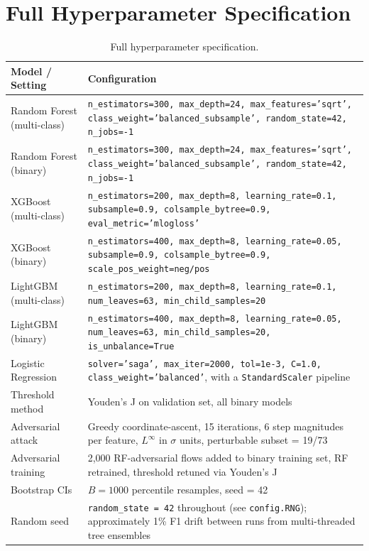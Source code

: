\chapter{Full Hyperparameter Specification}
\label{app:hyperparams}

\begin{table}[H]
    \centering
    \caption{Full hyperparameter specification.}
    \label{tab:hyperparams}
    \footnotesize
    \begin{tabular}{p{4.0cm}p{10.5cm}}
        \toprule
        \textbf{Model / Setting} & \textbf{Configuration} \\
        \midrule
        Random Forest (multi-class) & \texttt{n\_estimators=300, max\_depth=24, max\_features='sqrt', class\_weight='balanced\_subsample', random\_state=42, n\_jobs=-1} \\
        \addlinespace
        Random Forest (binary) & \texttt{n\_estimators=300, max\_depth=24, max\_features='sqrt', class\_weight='balanced\_subsample', random\_state=42, n\_jobs=-1} \\
        \addlinespace
        XGBoost (multi-class) & \texttt{n\_estimators=200, max\_depth=8, learning\_rate=0.1, subsample=0.9, colsample\_bytree=0.9, eval\_metric='mlogloss'} \\
        \addlinespace
        XGBoost (binary) & \texttt{n\_estimators=400, max\_depth=8, learning\_rate=0.05, subsample=0.9, colsample\_bytree=0.9, scale\_pos\_weight=neg/pos} \\
        \addlinespace
        LightGBM (multi-class) & \texttt{n\_estimators=200, max\_depth=8, learning\_rate=0.1, num\_leaves=63, min\_child\_samples=20} \\
        \addlinespace
        LightGBM (binary) & \texttt{n\_estimators=400, max\_depth=8, learning\_rate=0.05, num\_leaves=63, min\_child\_samples=20, is\_unbalance=True} \\
        \addlinespace
        Logistic Regression & \texttt{solver='saga', max\_iter=2000, tol=1e-3, C=1.0, class\_weight='balanced'}, with a \texttt{StandardScaler} pipeline \\
        \addlinespace
        Threshold method & Youden's J on validation set, all binary models \\
        \addlinespace
        Adversarial attack & Greedy coordinate-ascent, 15 iterations, 6 step magnitudes per feature, $L^\infty$ in $\sigma$ units, perturbable subset = 19/73 \\
        \addlinespace
        Adversarial training & 2{,}000 RF-adversarial flows added to binary training set, RF retrained, threshold retuned via Youden's J \\
        \addlinespace
        Bootstrap CIs & $B = 1000$ percentile resamples, seed = 42 \\
        \addlinespace
        Random seed & \texttt{random\_state = 42} throughout (see \texttt{config.RNG}); approximately 1\% F1 drift between runs from multi-threaded tree ensembles \\
        \bottomrule
    \end{tabular}
\end{table}

